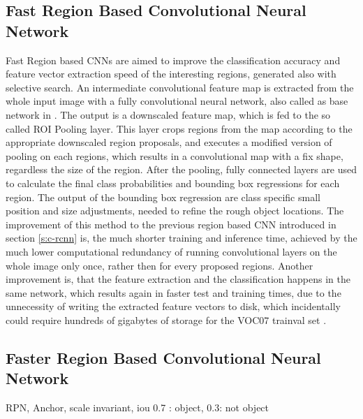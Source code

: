 \subsection{Fast Region Based Convolutional Neural Network}\label{s:c-fastrcnn}
Fast Region based CNNs \cite{Girshick:2016:RCN:2881668.2882239} are aimed to improve the classification accuracy and feature vector extraction speed of the interesting regions, generated also with selective search. An intermediate convolutional feature map is extracted from the whole input image with a fully convolutional neural network, also called as base network in \citep{journals/corr/SermanetEZMFL13}. The output is a downscaled feature map, which is fed to the so called ROI Pooling layer. This layer crops regions from the map according to the appropriate downscaled region proposals, and executes a modified version of pooling on each regions, which results in a convolutional map with a fix shape, regardless the size of the region. After the pooling, fully connected layers are used to calculate the final class probabilities and bounding box regressions for each region. The output of the bounding box regression are class specific small position and size adjustments, needed to refine the rough object locations.
\smallbreak
The improvement of this method to the previous region based CNN introduced in section \ref{s:c-rcnn} is, the much shorter training and inference time, achieved by the much lower computational redundancy of running convolutional layers on the whole image only once, rather then for every proposed regions. Another improvement is, that the feature extraction and the classification happens in the same network, which results again in faster test and training times, due to the unnecessity of writing the extracted feature vectors to disk, which incidentally could require hundreds of gigabytes of storage \cite{Girshick:2016:RCN:2881668.2882239} for the VOC07 trainval set \cite{pascal-voc-2007}.

\subsection{Faster Region Based Convolutional Neural Network}\label{s:c-fasterrcnn}
\cite{NIPS2015_5638}

RPN, Anchor, scale invariant,  iou 0.7 : object, 0.3: not object